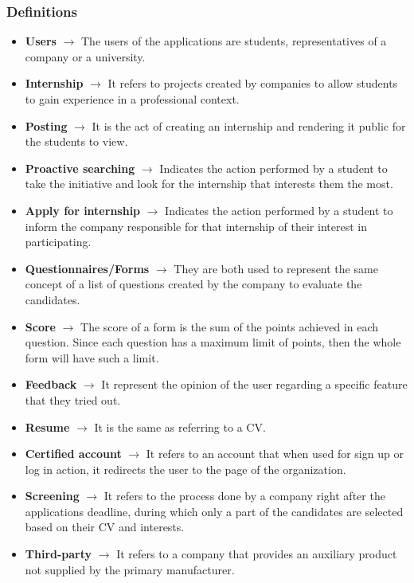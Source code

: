 \documentclass[11pt,twoside]{article}
\begin{document}
		\subsubsection{Definitions}
\begin{itemize}
\item \textbf{Users} $\rightarrow$ The users of the applications are students, representatives of a company or a university.
\item \textbf{Internship} $\rightarrow$ It refers to projects created by companies to allow students to gain experience in a professional context.
\item \textbf{Posting} $\rightarrow$ It is the act of creating an internship and rendering it public for the students to view.
\item \textbf{Proactive searching} $\rightarrow$ Indicates the action performed by a student to take the initiative and look for the internship that interests them the most.
\item \textbf{Apply for internship} $\rightarrow$ Indicates the action performed by a student to inform the company responsible for that internship of their interest in participating.
\item \textbf{Questionnaires/Forms} $\rightarrow$ They are both used to represent the same concept of a list of questions created by the company to evaluate the candidates.
\item \textbf{Score} $\rightarrow$ The score of a form is the sum of the points achieved in each question. Since each question has a maximum limit of points, then the whole form will have such a limit.
\item \textbf{Feedback} $\rightarrow$ It represent the opinion of the user regarding a specific feature that they tried out.
\item \textbf{Resume} $\rightarrow$ It is the same as referring to a CV.
\item \textbf{Certified account} $\rightarrow$ It refers to an account that when used for sign up or log in action, it redirects the user to the page of the organization.
\item \textbf{Screening} $\rightarrow$ It refers to the process done by a company right after the applications deadline, during which only a part of the candidates are selected based on their CV and interests.
\item \textbf{Third-party} $\rightarrow$ It refers to a company that provides an auxiliary product not supplied by the primary manufacturer.
\end{itemize}
\end{document}
